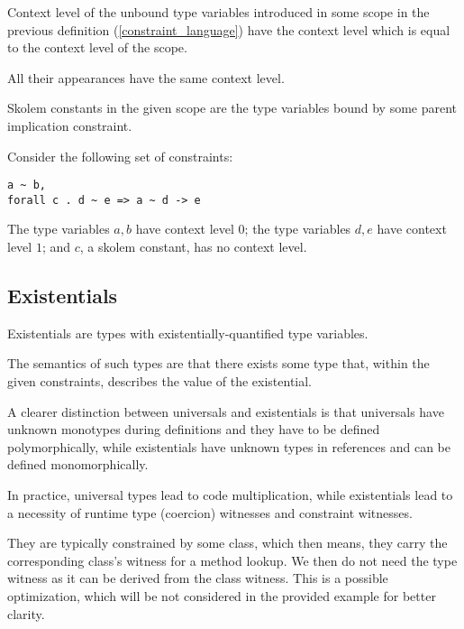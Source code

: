 \begin{defn}
    \label{constness_level}
    Context level of the unbound type variables introduced in some scope in the previous definition (\ref{constraint_language}) have the context level which is equal to the context level of the scope.

    All their appearances have the same context level.
\end{defn}

\begin{defn}
    Skolem constants in the given scope are the type variables bound by some parent implication constraint.
\end{defn}

\begin{ex} Consider the following set of constraints:

    \begin{lstlisting}
a ~ b,
forall c . d ~ e => a ~ d -> e
    \end{lstlisting}
    The type variables $a, b$ have context level $0$; the type variables $d, e$ have context level $1$; and $c$, a skolem constant, has no context level.
\end{ex}

\subsection{Existentials}

\label{existentials}

Existentials are types with existentially-quantified type variables.

The semantics of such types are that there exists some type that, within the given constraints, describes the value of the existential.

A clearer distinction between universals and existentials is that universals have unknown monotypes during definitions and they have to be defined polymorphically, while existentials have unknown types in references and can be defined monomorphically.

In practice, universal types lead to code multiplication, while existentials lead to a necessity of runtime type (coercion) witnesses and constraint witnesses.

They are typically constrained by some class, which then means, they carry the corresponding class's witness for a method lookup. We then do not need the type witness as it can be derived from the class witness. This is a possible optimization, which will be not considered in the provided example for better clarity.

